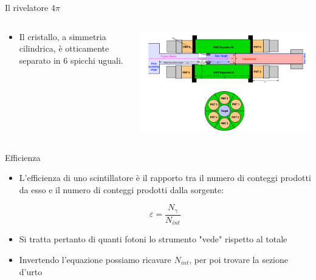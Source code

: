 \documentclass [xcolor=svgnames] {beamer}
\begin{document}
\begin{frame}{Il rivelatore $4\pi$}
	\begin{columns}
		\begin{column}{0.45\textwidth}
			\begin{itemize}%
				\item Il cristallo, a simmetria cilindrica, è otticamente separato in 6 spicchi uguali.
			\end{itemize}
		\end{column}
		\begin{column}{0.45\textwidth}
			\centering
			\includegraphics[width=\textwidth]{img/BGO.png}%
		\end{column}
	\end{columns}
\end{frame}


\begin{frame}{Efficienza}
	\begin{itemize}
			\item L'efficienza di uno scintillatore è il rapporto tra il numero di conteggi prodotti da esso e il numero di conteggi prodotti dalla sorgente:
			
			\begin{equation}
					\varepsilon = \dfrac{N_{\gamma}}{N_{int}}
				\end{equation}
			
			\item Si tratta pertanto di quanti fotoni lo strumento "vede" rispetto al totale
			\item Invertendo l'equazione possiamo ricavare $N_{int}$, per poi trovare la sezione d'urto
		\end{itemize}
\end{frame}
\end{document}
